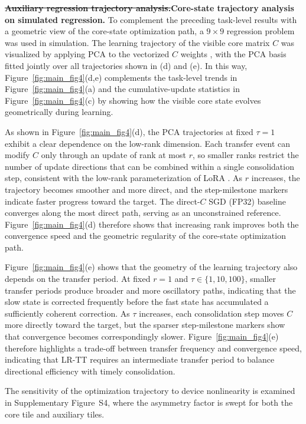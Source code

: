 \documentclass[AMA,LATO2COL]{WileyNJDv5}
\newcommand{\old}[1]{\sout{#1}}
\newcommand{\new}[1]{{\color{red}#1}}
\begin{document}
\noindent\textbf{\old{Auxiliary regression trajectory analysis.}\new{Core-state trajectory analysis on simulated regression.}}
\new{To complement the preceding task-level results with a geometric view of the core-state optimization path, a \(9\times9\) regression problem was used in simulation. The learning trajectory of the visible core matrix \(C\) was visualized by applying PCA to the vectorized \(C\) weights \cite{lorch2016visualizing,li2018visualizing}, with the PCA basis fitted jointly over all trajectories shown in (d) and (e). In this way, Figure~\ref{fig:main_fig4}(d,e) complements the task-level trends in Figure~\ref{fig:main_fig4}(a) and the cumulative-update statistics in Figure~\ref{fig:main_fig4}(c) by showing how the visible core state evolves geometrically during learning.}

\new{As shown in Figure~\ref{fig:main_fig4}(d), the PCA trajectories at fixed \(\tau=1\) exhibit a clear dependence on the low-rank dimension. Each transfer event can modify \(C\) only through an update of rank at most \(r\), so smaller ranks restrict the number of update directions that can be combined within a single consolidation step, consistent with the low-rank parameterization of LoRA \cite{hu2021lora}. As \(r\) increases, the trajectory becomes smoother and more direct, and the step-milestone markers indicate faster progress toward the target. The direct-\(C\) SGD (FP32) baseline converges along the most direct path, serving as an unconstrained reference. Figure~\ref{fig:main_fig4}(d) therefore shows that increasing rank improves both the convergence speed and the geometric regularity of the core-state optimization path.}

\new{Figure~\ref{fig:main_fig4}(e) shows that the geometry of the learning trajectory also depends on the transfer period. At fixed \(r=1\) and \(\tau\in\{1,10,100\}\), smaller transfer periods produce broader and more oscillatory paths, indicating that the slow state is corrected frequently before the fast state has accumulated a sufficiently coherent correction. As \(\tau\) increases, each consolidation step moves \(C\) more directly toward the target, but the sparser step-milestone markers show that convergence becomes correspondingly slower. Figure~\ref{fig:main_fig4}(e) therefore highlights a trade-off between transfer frequency and convergence speed, indicating that LR-TT requires an intermediate transfer period to balance directional efficiency with timely consolidation.}

\new{The sensitivity of the optimization trajectory to device nonlinearity is examined in Supplementary Figure~S4, where the asymmetry factor is swept for both the core tile and auxiliary tiles.}
\end{document}
